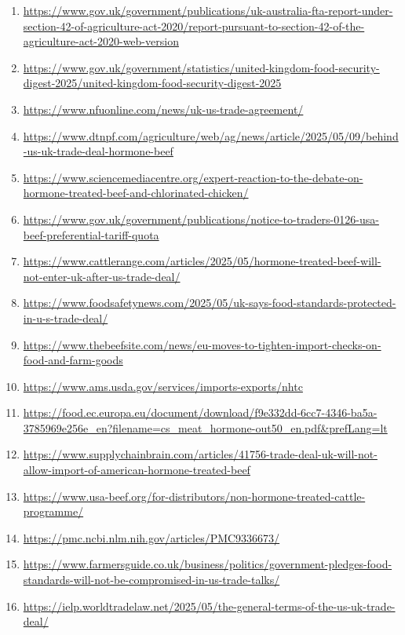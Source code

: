 \documentclass[10pt,a4paper]{article}
\begin{document}
\begin{enumerate}[leftmargin=*]
            \item \url{ https://www.gov.uk/government/publications/uk-australia-fta-report-under-section-42-of-agriculture-act-2020/report-pursuant-to-section-42-of-the-agriculture-act-2020-web-version }
            \item \url{ https://www.gov.uk/government/statistics/united-kingdom-food-security-digest-2025/united-kingdom-food-security-digest-2025 }
            \item \url{ https://www.nfuonline.com/news/uk-us-trade-agreement/ }
            \item \url{ https://www.dtnpf.com/agriculture/web/ag/news/article/2025/05/09/behind-us-uk-trade-deal-hormone-beef }
            \item \url{ https://www.sciencemediacentre.org/expert-reaction-to-the-debate-on-hormone-treated-beef-and-chlorinated-chicken/ }
            \item \url{ https://www.gov.uk/government/publications/notice-to-traders-0126-usa-beef-preferential-tariff-quota }
            \item \url{ https://www.cattlerange.com/articles/2025/05/hormone-treated-beef-will-not-enter-uk-after-us-trade-deal/ }
            \item \url{ https://www.foodsafetynews.com/2025/05/uk-says-food-standards-protected-in-u-s-trade-deal/ }
            \item \url{ https://www.thebeefsite.com/news/eu-moves-to-tighten-import-checks-on-food-and-farm-goods }
            \item \url{ https://www.ams.usda.gov/services/imports-exports/nhtc }
            \item \url{ https://food.ec.europa.eu/document/download/f9e332dd-6cc7-4346-ba5a-3785969e256e\_en?filename=cs\_meat\_hormone-out50\_en.pdf\&prefLang=lt }
            \item \url{ https://www.supplychainbrain.com/articles/41756-trade-deal-uk-will-not-allow-import-of-american-hormone-treated-beef }
            \item \url{ https://www.usa-beef.org/for-distributors/non-hormone-treated-cattle-programme/ }
            \item \url{ https://pmc.ncbi.nlm.nih.gov/articles/PMC9336673/ }
            \item \url{ https://www.farmersguide.co.uk/business/politics/government-pledges-food-standards-will-not-be-compromised-in-us-trade-talks/ }
            \item \url{ https://ielp.worldtradelaw.net/2025/05/the-general-terms-of-the-us-uk-trade-deal/ }

\end{enumerate}
\end{document}
